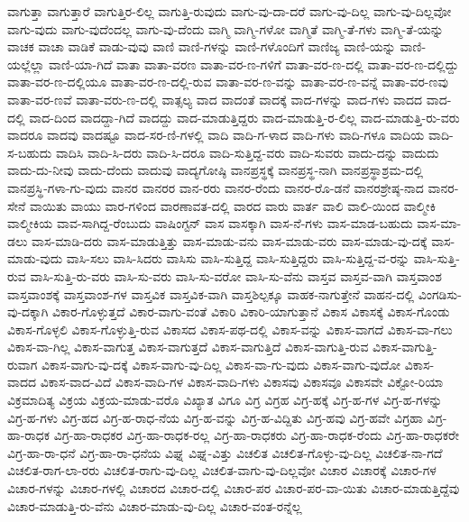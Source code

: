 {ವಾಗುತ್ತಾ
ವಾಗುತ್ತಾರೆ
ವಾಗುತ್ತಿರ-ಲಿಲ್ಲ
ವಾಗುತ್ತಿ-ರುವುದು
ವಾಗು-ವು-ದಾ-ದರೆ
ವಾಗು-ವು-ದಿಲ್ಲ
ವಾಗು-ವು-ದಿಲ್ಲವೋ
ವಾಗು-ವುದು
ವಾಗು-ವುದೆಂದಲ್ಲ
ವಾಗು-ವು-ದೆಂದು
ವಾಗ್ಮಿ
ವಾಗ್ಮಿ-ಗಳೋ
ವಾಗ್ಮಿತೆ
ವಾಗ್ಮಿ-ತೆ-ಗಳು
ವಾಗ್ಮಿ-ತೆ-ಯನ್ನು
ವಾಚಕ
ವಾಚಾ
ವಾಡಿಕೆ
ವಾಡು-ವುವು
ವಾಣಿ
ವಾಣಿ-ಗಳನ್ನು
ವಾಣಿ-ಗಳೊಂದಿಗೆ
ವಾಣಿಜ್ಯ
ವಾಣಿ-ಯನ್ನು
ವಾಣಿ-ಯಲ್ಲೆಲ್ಲಾ
ವಾಣಿ-ಯಾ-ಗಿದೆ
ವಾತಾ
ವಾತಾ-ವರಣ
ವಾತಾ-ವರ-ಣ-ಗಳಿಗೆ
ವಾತಾ-ವರ-ಣ-ದಲ್ಲಿ
ವಾತಾ-ವರ-ಣ-ದಲ್ಲಿದ್ದು
ವಾತಾ-ವರ-ಣ-ದಲ್ಲಿಯೂ
ವಾತಾ-ವರ-ಣ-ದಲ್ಲಿ-ರುವ
ವಾತಾ-ವರ-ಣ-ವನ್ನು
ವಾತಾ-ವರ-ಣ-ವನ್ನೆ
ವಾತಾ-ವರ-ಣವು
ವಾತಾ-ವರ-ಣವೆ
ವಾತಾ-ವರು-ಣ-ದಲ್ಲಿ
ವಾತ್ಸಲ್ಯ
ವಾದ
ವಾದಂತೆ
ವಾದಕ್ಕೆ
ವಾದ-ಗಳನ್ನು
ವಾದ-ಗಳು
ವಾದದ
ವಾದ-ದಲ್ಲಿ
ವಾದ-ದಿಂದ
ವಾದದ್ದಾ-ಗಿದೆ
ವಾದದ್ದು
ವಾದ-ಮಾಡುತ್ತಿದ್ದರು
ವಾದ-ಮಾಡುತ್ತಿ-ರ-ಲಿಲ್ಲ
ವಾದ-ಮಾಡುತ್ತಿ-ರು-ವರು
ವಾದರೂ
ವಾದವು
ವಾದಷ್ಟೂ
ವಾದ-ಸರ-ಣಿ-ಗಳಲ್ಲಿ
ವಾದಿ
ವಾದಿ-ಗ-ಳಾದ
ವಾದಿ-ಗಳು
ವಾದಿ-ಗಳೂ
ವಾದಿಯ
ವಾದಿ-ಸ-ಬಹುದು
ವಾದಿಸಿ
ವಾದಿ-ಸಿ-ದರು
ವಾದಿ-ಸಿ-ದರೂ
ವಾದಿ-ಸುತ್ತಿದ್ದ-ವರು
ವಾದಿ-ಸುವರು
ವಾದು-ದನ್ನು
ವಾದುದು
ವಾದು-ದು-ನೀವು
ವಾದು-ದೆಂದು
ವಾದುವು
ವಾದ್ಯಗೋಷ್ಠಿ
ವಾನಪ್ರಸ್ಥಕ್ಕೆ
ವಾನಪ್ರಸ್ಥ-ನಾಗಿ
ವಾನಪ್ರಸ್ಥಾಶ್ರಮ-ದಲ್ಲಿ
ವಾನಪ್ರಸ್ಥಿ-ಗಳಾ-ಗು-ವುದು
ವಾನರ
ವಾನರರ
ವಾನ-ರರು
ವಾನರ-ರೆಂದು
ವಾನರ-ರೊ-ಡನೆ
ವಾನರಶ್ರೇಷ್ಠ-ನಾದ
ವಾನರ-ಸೇನೆ
ವಾಯಿತು
ವಾಯು
ವಾರ-ಗಳಿಂದ
ವಾರಣಾವತ-ದಲ್ಲಿ
ವಾರದ
ವಾರು
ವಾರ್ತ
ವಾಲಿ
ವಾಲಿ-ಯಿಂದ
ವಾಲ್ಮೀಕಿ
ವಾಲ್ಮೀಕಿಯ
ವಾವ-ಸಾಗಿದ್ದ-ರೆಂಬುದು
ವಾಷಿಂಗ್ಟನ್
ವಾಸ
ವಾಸಕ್ಕಾಗಿ
ವಾಸ-ನೆ-ಗಳು
ವಾಸ-ಮಾಡ-ಬಹುದು
ವಾಸ-ಮಾ-ಡಲು
ವಾಸ-ಮಾಡಿ-ದರು
ವಾಸ-ಮಾಡುತ್ತಿತ್ತು
ವಾಸ-ಮಾಡು-ವನು
ವಾಸ-ಮಾಡು-ವರು
ವಾಸ-ಮಾಡು-ವು-ದಕ್ಕೆ
ವಾಸ-ಮಾಡು-ವುದು
ವಾಸಿ-ಸಲು
ವಾಸಿ-ಸಿದರು
ವಾಸಿಸು
ವಾಸಿ-ಸುತ್ತಿದ್ದ
ವಾಸಿ-ಸುತ್ತಿದ್ದರು
ವಾಸಿ-ಸುತ್ತಿದ್ದ-ವ-ರನ್ನು
ವಾಸಿ-ಸುತ್ತಿ-ರುವ
ವಾಸಿ-ಸುತ್ತಿ-ರು-ವರು
ವಾಸಿ-ಸು-ವರು
ವಾಸಿ-ಸು-ವರೋ
ವಾಸಿ-ಸು-ವೆನು
ವಾಸ್ತವ
ವಾಸ್ತವ-ವಾಗಿ
ವಾಸ್ತವಾಂಶ
ವಾಸ್ತವಾಂಶಕ್ಕೆ
ವಾಸ್ತವಾಂಶ-ಗಳ
ವಾಸ್ತವಿಕ
ವಾಸ್ತವಿಕ-ವಾಗಿ
ವಾಸ್ತಶಿಲ್ಪಕ್ಕೂ
ವಾಹಕ-ನಾಗುತ್ತೇನೆ
ವಾಹನ-ದಲ್ಲಿ
ವಿಂಗಡಿಸು-ವು-ದಕ್ಕಾಗಿ
ವಿಕಾರ-ಗೊಳ್ಳುತ್ತದೆ
ವಿಕಾರ-ವಾಗು-ವಂತೆ
ವಿಕಾರಿ
ವಿಕಾರಿ-ಯಾಗುತ್ತಾನೆ
ವಿಕಾಸ
ವಿಕಾಸಕ್ಕೆ
ವಿಕಾಸ-ಗೊಂಡು
ವಿಕಾಸ-ಗೊಳ್ಳಲಿ
ವಿಕಾಸ-ಗೊಳ್ಳುತ್ತಿ-ರುವ
ವಿಕಾಸದ
ವಿಕಾಸ-ಪಥ-ದಲ್ಲಿ
ವಿಕಾಸ-ವನ್ನು
ವಿಕಾಸ-ವಾಗದೆ
ವಿಕಾಸ-ವಾ-ಗಲು
ವಿಕಾಸ-ವಾ-ಗಿಲ್ಲ
ವಿಕಾಸ-ವಾಗುತ್ತ
ವಿಕಾಸ-ವಾಗುತ್ತದೆ
ವಿಕಾಸ-ವಾಗುತ್ತಿದೆ
ವಿಕಾಸ-ವಾಗುತ್ತಿ-ರುವ
ವಿಕಾಸ-ವಾಗುತ್ತಿ-ರುವಾಗ
ವಿಕಾಸ-ವಾಗು-ವು-ದಕ್ಕೆ
ವಿಕಾಸ-ವಾಗು-ವು-ದಿಲ್ಲ
ವಿಕಾಸ-ವಾ-ಗು-ವುದು
ವಿಕಾಸ-ವಾಗು-ವುದೋ
ವಿಕಾಸ-ವಾದದ
ವಿಕಾಸ-ವಾದ-ವಿದೆ
ವಿಕಾಸ-ವಾದಿ-ಗಳ
ವಿಕಾಸ-ವಾದಿ-ಗಳು
ವಿಕಾಸವು
ವಿಕಾಸವೂ
ವಿಕಾಸವೇ
ವಿಕ್ಟೋ-ರಿಯಾ
ವಿಕ್ರಮಾದಿತ್ಯ
ವಿಕ್ರಯ
ವಿಕ್ರಯ-ಮಾಡು-ವರೊ
ವಿಖ್ಯಾತ
ವಿಗೂ
ವಿಗ್ರ
ವಿಗ್ರಹ
ವಿಗ್ರ-ಹಕ್ಕೆ
ವಿಗ್ರ-ಹ-ಗಳ
ವಿಗ್ರ-ಹ-ಗಳನ್ನು
ವಿಗ್ರ-ಹ-ಗಳು
ವಿಗ್ರ-ಹದ
ವಿಗ್ರ-ಹ-ರಾಧ-ನೆಯ
ವಿಗ್ರ-ಹ-ವನ್ನು
ವಿಗ್ರ-ಹ-ವಿದ್ದಿತು
ವಿಗ್ರ-ಹವು
ವಿಗ್ರ-ಹವೇ
ವಿಗ್ರಹಾ
ವಿಗ್ರ-ಹಾ-ರಾಧಕ
ವಿಗ್ರ-ಹಾ-ರಾಧಕರ
ವಿಗ್ರ-ಹಾ-ರಾಧಕ-ರಲ್ಲ
ವಿಗ್ರ-ಹಾ-ರಾಧಕರು
ವಿಗ್ರ-ಹಾ-ರಾಧಕ-ರೆಂದು
ವಿಗ್ರ-ಹಾ-ರಾಧಕರೇ
ವಿಗ್ರ-ಹಾ-ರಾ-ಧನೆ
ವಿಗ್ರ-ಹಾ-ರಾ-ಧನೆಯ
ವಿಘ್ನ
ವಿಘ್ನ-ವಿತ್ತು
ವಿಚಲಿತ
ವಿಚಲಿತ-ಗೊಳ್ಳು-ವು-ದಿಲ್ಲ
ವಿಚಲಿತ-ನಾ-ಗದೆ
ವಿಚಲಿತ-ರಾಗ-ಲಾ-ರರು
ವಿಚಲಿತ-ರಾಗು-ವು-ದಿಲ್ಲ
ವಿಚಲಿತ-ವಾಗು-ವು-ದಿಲ್ಲವೋ
ವಿಚಾರ
ವಿಚಾರಕ್ಕೆ
ವಿಚಾರ-ಗಳ
ವಿಚಾರ-ಗಳನ್ನು
ವಿಚಾರ-ಗಳಲ್ಲಿ
ವಿಚಾರದ
ವಿಚಾರ-ದಲ್ಲಿ
ವಿಚಾರ-ಪರ
ವಿಚಾರ-ಪರ-ವಾ-ಯಿತು
ವಿಚಾರ-ಮಾಡುತ್ತಿದ್ದೆವು
ವಿಚಾರ-ಮಾಡುತ್ತಿ-ರು-ವೆನು
ವಿಚಾರ-ಮಾಡು-ವು-ದಿಲ್ಲ
ವಿಚಾರ-ವಂತ-ರನ್ನೆಲ್ಲ
}

